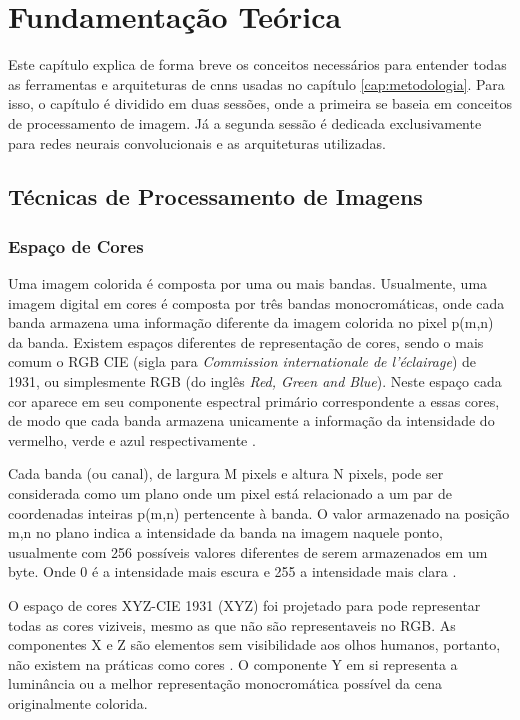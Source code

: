 \chapter{Fundamentação Teórica}\label{cap:fundamentação}

Este capítulo explica de forma breve os conceitos necessários para entender todas as ferramentas e arquiteturas de \acrshort{cnn}s usadas no capítulo \ref{cap:metodologia}. Para isso, o capítulo é dividido em duas sessões, onde a primeira se baseia em conceitos de processamento de imagem. Já a segunda sessão é dedicada exclusivamente para redes neurais convolucionais e as arquiteturas utilizadas.

\section{Técnicas de Processamento de Imagens}

\subsection{Espaço de Cores}
Uma imagem colorida é composta por uma ou mais bandas. 
Usualmente, uma imagem digital em cores é composta por três bandas monocromáticas, onde cada banda armazena uma informação diferente da imagem colorida no pixel p(m,n) da banda. 
Existem espaços diferentes de representação de cores, sendo o mais comum o RGB  CIE (sigla para \textit{Commission internationale de l'éclairage}) de 1931, 
ou simplesmente RGB (do inglês \textit{Red, Green and Blue}). 
Neste espaço cada cor aparece em seu componente espectral primário correspondente a essas cores, de modo que cada banda armazena unicamente a informação da intensidade do vermelho, verde e azul respectivamente \cite{gonzalez, jaelim}. 

Cada banda (ou canal), de largura M pixels e altura N pixels, pode ser considerada como um plano onde um pixel está relacionado a um par de coordenadas inteiras p(m,n) pertencente à banda. 
O valor armazenado na posição m,n no plano indica a intensidade da banda na imagem naquele ponto, usualmente com 256 possíveis valores diferentes de serem armazenados em um byte. 
Onde 0 é a intensidade mais escura e 255 a intensidade mais clara \cite{jaelim, shapiro}.

O espaço de cores XYZ-CIE 1931 (XYZ) foi projetado para pode representar todas as cores viziveis, mesmo as que não são representaveis no RGB. As componentes X e Z são elementos sem visibilidade aos olhos humanos, portanto, não existem na práticas como cores \cite{ohta}. O componente Y em si representa a luminância ou a melhor representação monocromática possível da cena originalmente colorida.

